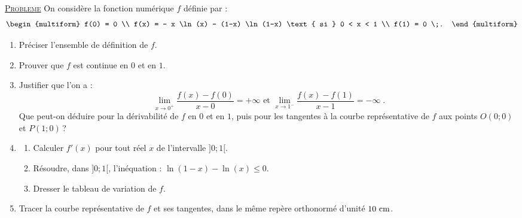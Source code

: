 \noindent \underline{\textsc{Probleme}} \newline
      On consid\`ere la fonction num\'erique $f$ d\'efinie par : 
      \[
            \begin{multiform}
                  f(0) = 0 \\
                  f(x) = - x \ln (x) - (1-x) \ln (1-x) \text{ si } 0 < x < 1 \\
                  f(1) = 0 \;.
            \end{multiform}
      \]
      \begin{enumerate}
            \item Pr\'eciser l'ensemble de d\'efinition de $f$.
            \item Prouver que $f$ est continue en $0$ et en $1$.
            \item Justifier que l'on a : 
                  \[
                        \lim_{x\rightarrow 0^+} \frac{f(x) - f(0)}{x - 0} = +\infty
                        \text{ et } 
                        \lim_{x\rightarrow 1^-} \frac{f(x) - f(1)}{x - 1} = -\infty \;.
                  \]
                  Que peut-on d\'eduire pour la d\'erivabilit\'e de $f$ en $0$ et en $1$, 
                  puis pour les tangentes \`a la courbe repr\'esentative de $f$ aux points 
                  $O(0;0)$ et $P(1;0)$\,?
            \item \begin{enumerate}
                        \item Calculer $f'(x)$ pour tout r\'eel $x$ de l'intervalle $]0;1[$.
                        \item R\'esoudre, dans $]0;1[$, l'in\'equation : $\ln (1-x) - \ln (x) \leq 0$.
                        \item Dresser le tableau de variation de $f$.
                  \end{enumerate}
            \item Tracer la courbe repr\'esentative de $f$ et ses tangentes, dans le m\^eme rep\`ere orthonorm\'e 
                  \Oij{} d'unit\'e $10~\mathrm{cm}$.
                  

\end{enumerate}
